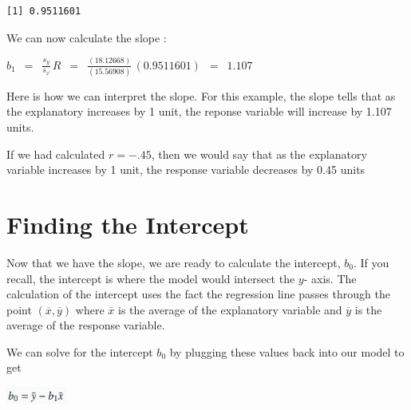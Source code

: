 \documentclass[
  letterpaper,
  DIV=11,
  numbers=noendperiod]{scrreprt}
\begin{document}
\begin{verbatim}
[1] 0.9511601
\end{verbatim}

We can now calculate the slope :

\(\displaystyle{b_1\,\,\, = \,\,\,\frac{s_y}{s_x}\, R\,\,\, =
\,\,\,\frac{(18.12668)}{(15.56908)}\,(0.9511601)\,\,\, =\,\,\, 1.107 }\)

\begin{tcolorbox}[enhanced jigsaw, opacitybacktitle=0.6, coltitle=black, colframe=quarto-callout-tip-color-frame, colback=white, left=2mm, bottomtitle=1mm, breakable, leftrule=.75mm, arc=.35mm, toptitle=1mm, title=\textcolor{quarto-callout-tip-color}{\faLightbulb}\hspace{0.5em}{Interpreting the Slope}, opacityback=0, rightrule=.15mm, bottomrule=.15mm, titlerule=0mm, toprule=.15mm, colbacktitle=quarto-callout-tip-color!10!white]

Here is how we can interpret the slope. For this example, the slope
tells that as the explanatory increases by 1 unit, the reponse variable
will increase by 1.107 units.

If we had calculated \(r = -.45\), then we would say that as the
explanatory variable increases by 1 unit, the response variable
decreases by 0.45 units

\end{tcolorbox}

\section*{Finding the Intercept}\label{finding-the-intercept}


Now that we have the slope, we are ready to calculate the intercept,
\(b_0\). If you recall, the intercept is where the model would intersect
the \(y\)- axis. The calculation of the intercept uses the fact the
regression line passes through the point
\(( \overline{x}, \overline{y})\) where \(\overline{x}\) is the average
of the explanatory variable and \(\overline{y}\) is the average of the
response variable.

We can solve for the intercept \(b_0\) by plugging these values back
into our model to get

\includegraphics[width=0.15\textwidth,height=\textheight]{./images/LMR_5.jpg}
\end{document}

